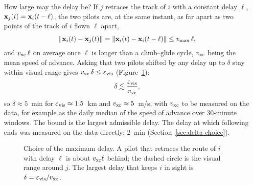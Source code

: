 How large may the delay be? If $j$ retraces the track of $i$ with a constant delay $\ell$,
$\mathbf{x}_j(t)=\mathbf{x}_i(t-\ell)$, the two pilots are, at the same instant, as far apart as two points of the
track of $i$ flown $\ell$ apart,
\[
  \|\mathbf{x}_i(t)-\mathbf{x}_j(t)\| = \|\mathbf{x}_i(t)-\mathbf{x}_i(t-\ell)\| \le v_{\max}\,\ell ,
\]
and $v_{\mathrm{xc}}\,\ell$ on average once $\ell$ is longer than a climb--glide cycle, $v_{\mathrm{xc}}$ being the
mean speed of advance. Asking that two pilots shifted by any delay up to $\delta$ stay within
visual range gives $v_{\mathrm{xc}}\,\delta\le\varepsilon_{\mathrm{vis}}$ (Figure~\ref{fig:delta}):
\begin{equation}\label{eq:delta}
  \delta\lesssim\frac{\varepsilon_{\mathrm{vis}}}{v_{\mathrm{xc}}},
\end{equation}
so $\delta\approx5$~min for $\varepsilon_{\mathrm{vis}}\approx1.5$~km and $v_{\mathrm{xc}}\approx5$~m/s, with $v_{\mathrm{xc}}$
to be measured on the data, for example as the daily median of the speed of advance over
30-minute windows. The bound is the largest admissible delay. The delay at which following ends
was measured on the data directly: 2~min (Section~\ref{sec:delta-choice}).

\begin{figure}
\centering
{}
\caption{Choice of the maximum delay. A pilot that retraces the route of $i$ with delay $\ell$ is
about $v_{\mathrm{xc}}\ell$ behind; the dashed circle is the visual range around $j$. The largest delay that
keeps $i$ in sight is $\delta=\varepsilon_{\mathrm{vis}}/v_{\mathrm{xc}}$.}
\label{fig:delta}
\end{figure}

